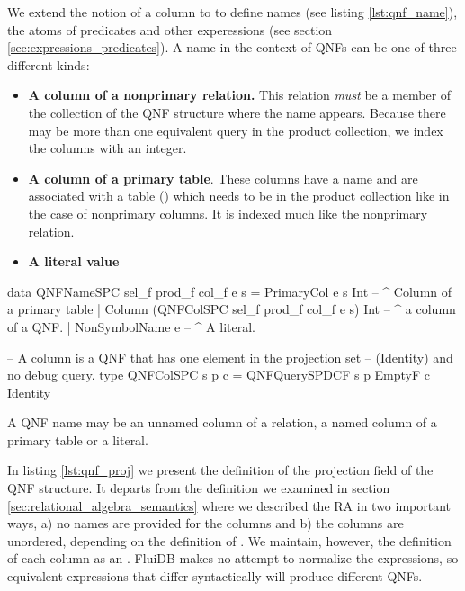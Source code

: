 We extend the notion of a column to to define names (see listing
\ref{lst:qnf_name}), the atoms of predicates and other experessions
(see section \ref{sec:expressions_predicates}).  A name in the context
of QNFs can be one of three different kinds:

\begin{itemize}
\item \textbf{A column of a nonprimary relation.} This relation
  \emph{must} be a member of the  collection of the
  QNF structure where the name appears.  Because there may be more
  than one equivalent query in the product collection, we index the
  columns with an integer.
\item \textbf{A column of a primary table}. These columns have a name
  and are associated with a table () which needs to be in the
  product collection like in the case of nonprimary columns. It is
  indexed much like the nonprimary relation.
\item \textbf{A literal value}
\end{itemize}

\begin{code}
  \begin{haskellcode}
    data QNFNameSPC sel_f prod_f col_f e s =
      PrimaryCol e s Int
      -- ^ Column of a primary table
      | Column (QNFColSPC sel_f prod_f col_f e s) Int
      -- ^ a column of a QNF.
      | NonSymbolName e
      -- ^ A literal.
      
    -- A column is a QNF that has one element in the projection set
    -- (Identity) and no debug query.
    type QNFColSPC s p c = QNFQuerySPDCF s p EmptyF c Identity
  \end{haskellcode}
  \caption{\label{lst:qnf_name}A QNF name may be an unnamed column of
    a relation, a named column of a primary table or a literal.}
\end{code}

In listing \ref{lst:qnf_proj} we present the definition of the projection
field of the QNF structure. It departs from the definition we examined in
section \ref{sec:relational_algebra_semantics} where we described the RA in two
important ways, a) no names are provided for the columns and b) the columns are
unordered, depending on the definition of .
We maintain, however, the definition of each column as an .
FluiDB makes no attempt to normalize the expressions, so equivalent
expressions that differ syntactically will produce different QNFs.

